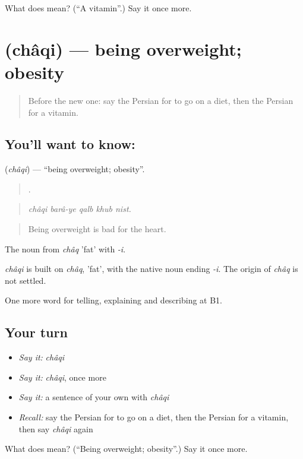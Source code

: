 \begin{tcolorbox}[breakable,colback=teal!4,colframe=teal!35!black,title={Before you move on}]
What does  mean? (\textquotedblleft{}A vitamin\textquotedblright{}.) Say it once more.
\end{tcolorbox}
\section[\texorpdfstring{\fa{چاقی} (châqi)}{چاقی (châqi)}]{ (châqi) — being overweight; obesity}

\label{lesson:FA-C498-chaqi}



\begin{quote}
Before the new one: say the Persian for to go on a diet, then the Persian for a vitamin.
\end{quote}

\subsection*{You'll want to know: }
\textbf{} (\emph{châqi}) — \textquotedblleft{}being overweight; obesity\textquotedblright{}.

\begin{quote}
    .
\end{quote}

\begin{quote}
\emph{châqi barâ-ye qalb khub nist.}
\end{quote}

\begin{quote}
Being overweight is bad for the heart.
\end{quote}

The noun from \emph{châq} 'fat' with \emph{-i}.

\begin{cousinweb}
\emph{châqi} is built on \emph{châq}, 'fat', with the native noun ending \emph{-i}. The origin of \emph{châq} is not settled.
\end{cousinweb}

\begin{grammarlens}[title={What you've built}]
One more word for telling, explaining and describing at B1.
\end{grammarlens}

\subsection*{Your turn}
\begin{itemize}
\raggedright
  \item \emph{Say it:} \emph{châqi}
  \item \emph{Say it:} \emph{châqi}, once more
  \item \emph{Say it:} a sentence of your own with \emph{châqi}
  \item \emph{Recall:} say the Persian for to go on a diet, then the Persian for a vitamin, then say \emph{châqi} again
\end{itemize}

\begin{tcolorbox}[breakable,colback=teal!4,colframe=teal!35!black,title={Before you move on}]
What does  mean? (\textquotedblleft{}Being overweight; obesity\textquotedblright{}.) Say it once more.
\end{tcolorbox}
